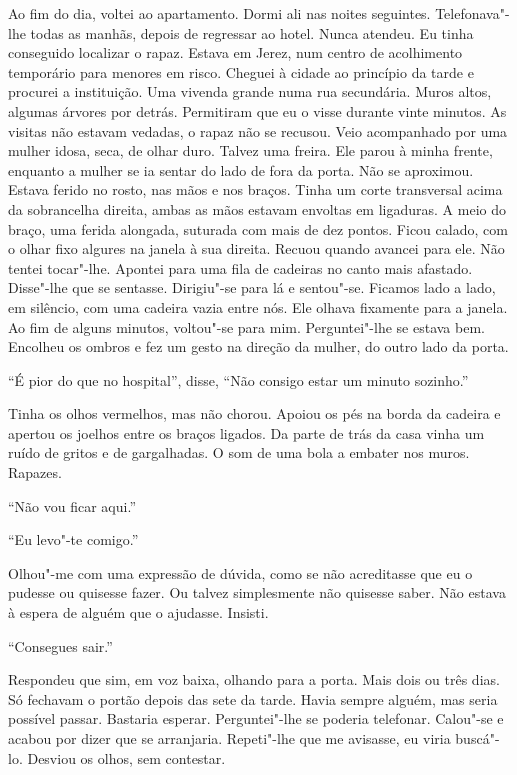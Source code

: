 Ao fim do dia, voltei ao apartamento. Dormi ali nas noites seguintes.
Telefonava"-lhe todas as manhãs, depois de regressar ao hotel. Nunca
atendeu. Eu tinha conseguido localizar o rapaz. Estava em Jerez, num
centro de acolhimento temporário para menores em risco. Cheguei à cidade
ao princípio da tarde e procurei a instituição. Uma vivenda grande numa
rua secundária. Muros altos, algumas árvores por detrás. Permitiram que
eu o visse durante vinte minutos. As visitas não estavam vedadas, o
rapaz não se recusou. Veio acompanhado por uma mulher idosa, seca, de
olhar duro. Talvez uma freira. Ele parou à minha frente, enquanto a
mulher se ia sentar do lado de fora da porta. Não se aproximou. Estava
ferido no rosto, nas mãos e nos braços. Tinha um corte transversal acima
da sobrancelha direita, ambas as mãos estavam envoltas em ligaduras. A
meio do braço, uma ferida alongada, suturada com mais de dez pontos.
Ficou calado, com o olhar fixo algures na janela à sua direita. Recuou
quando avancei para ele. Não tentei tocar"-lhe. Apontei para uma fila de
cadeiras no canto mais afastado. Disse"-lhe que se sentasse. Dirigiu"-se
para lá e sentou"-se. Ficamos lado a lado, em silêncio, com uma cadeira
vazia entre nós. Ele olhava fixamente para a janela. Ao fim de alguns
minutos, voltou"-se para mim. Perguntei"-lhe se estava bem. Encolheu os
ombros e fez um gesto na direção da mulher, do outro lado da porta.

``É pior do que no hospital'',
disse,
``Não consigo estar um minuto sozinho.''

Tinha os olhos vermelhos, mas não chorou. Apoiou os pés na borda da
cadeira e apertou os joelhos entre os braços ligados. Da parte de trás
da casa vinha um ruído de gritos e de gargalhadas. O som de uma bola a
embater nos muros. Rapazes.

``Não vou ficar aqui.''

``Eu levo"-te comigo.''

Olhou"-me com uma expressão de dúvida, como se não acreditasse que eu o
pudesse ou quisesse fazer. Ou talvez simplesmente não quisesse saber.
Não estava à espera de alguém que o ajudasse. Insisti.

``Consegues sair.''

Respondeu que sim, em voz baixa, olhando para a porta. Mais dois ou três
dias. Só fechavam o portão depois das sete da tarde. Havia sempre
alguém, mas seria possível passar. Bastaria esperar. Perguntei"-lhe se
poderia telefonar. Calou"-se e acabou por dizer que se arranjaria.
Repeti"-lhe que me avisasse, eu viria buscá"-lo. Desviou os olhos, sem
contestar.

